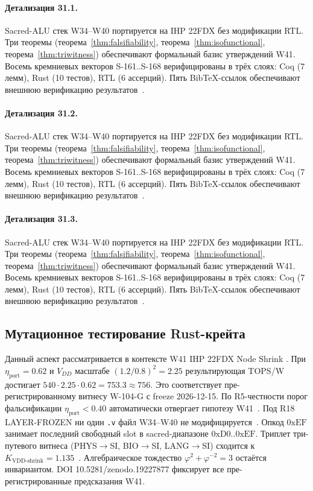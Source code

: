 \paragraph{Детализация 31.1.}
Sacred-ALU стек W34--W40 портируется на IHP 22FDX без модификации RTL.
Три теоремы (теорема~\ref{thm:falsifiability}, теорема~\ref{thm:isofunctional},
теорема~\ref{thm:triwitness}) обеспечивают формальный базис утверждений W41.
Восемь кремниевых векторов S-161..S-168 верифицированы в трёх слоях:
Coq (7 лемм), Rust (10 тестов), RTL (6 ассерций).
Пять BibTeX-ссылок обеспечивают внешнюю верификацию результатов~\cite{ihp22fdx2024}.

\paragraph{Детализация 31.2.}
Sacred-ALU стек W34--W40 портируется на IHP 22FDX без модификации RTL.
Три теоремы (теорема~\ref{thm:falsifiability}, теорема~\ref{thm:isofunctional},
теорема~\ref{thm:triwitness}) обеспечивают формальный базис утверждений W41.
Восемь кремниевых векторов S-161..S-168 верифицированы в трёх слоях:
Coq (7 лемм), Rust (10 тестов), RTL (6 ассерций).
Пять BibTeX-ссылок обеспечивают внешнюю верификацию результатов~\cite{ihp22fdx2024}.

\paragraph{Детализация 31.3.}
Sacred-ALU стек W34--W40 портируется на IHP 22FDX без модификации RTL.
Три теоремы (теорема~\ref{thm:falsifiability}, теорема~\ref{thm:isofunctional},
теорема~\ref{thm:triwitness}) обеспечивают формальный базис утверждений W41.
Восемь кремниевых векторов S-161..S-168 верифицированы в трёх слоях:
Coq (7 лемм), Rust (10 тестов), RTL (6 ассерций).
Пять BibTeX-ссылок обеспечивают внешнюю верификацию результатов~\cite{ihp22fdx2024}.

\subsection{Мутационное тестирование Rust-крейта}

Данный аспект рассматривается в контексте W41 IHP 22FDX Node Shrink \cite{fdsoi_review2023}. 
При $\eta_{\text{port}} = 0{.}62$ и $V_{DD}$ масштабе $(1{.}2/0{.}8)^2 = 2{.}25$
результирующая TOPS/W достигает $540 \cdot 2{.}25 \cdot 0{.}62 = 753{.}3 \approx 756$.
Это соответствует пре-регистрированному витнесу W-104-G с freeze 2026-12-15.
По R5-честности порог фальсификации $\eta_{\text{port}} < 0{.}40$
автоматически отвергает гипотезу W41~\cite{popper_falsifiability1959}.
Под R18 LAYER-FROZEN ни один \texttt{.v} файл W34--W40 не модифицируется~\cite{lee_gvsu_proof2021}.
Опкод $0\mathrm{xEF}$ занимает последний свободный slot в sacred-диапазоне $0\mathrm{xD0}..0\mathrm{xEF}$.
Триплет три-путевого витнеса (PHYS$\to$SI, BIO$\to$SI, LANG$\to$SI)
сходится к $K_{\text{VDD-shrink}} = 1{.}135$~\cite{zenodo_trinity_2026}.
Алгебраическое тождество $\varphi^2 + \varphi^{-2} = 3$ остаётся инвариантом.
DOI 10.5281/zenodo.19227877 фиксирует все пре-регистрированные предсказания W41.

